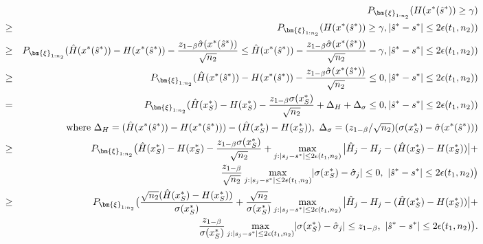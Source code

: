 \documentclass[mnsc,blindrev]{informs4} %
\begin{document}
\begin{eqnarray*}
&&P_{\bm{\xi}_{1:n_2}}(H(x^*(\hat s^*))\geq \gamma)\\
&\geq&P_{\bm{\xi}_{1:n_2}}(H(x^*(\hat s^*))\geq \gamma,\lvert \hat s^*-s^*\rvert\leq 2\epsilon(t_1,n_2))\\
&\geq&P_{\bm{\xi}_{1:n_2}}(\hat H(x^*(\hat s^*))-H(x^*(\hat s^*))-\frac{z_{1-\beta}\hat \sigma(x^*(\hat s^*))}{\sqrt{n_2}}\leq \hat H(x^*(\hat s^*))-\frac{z_{1-\beta}\hat \sigma(x^*(\hat s^*))}{\sqrt{n_2}}- \gamma,\lvert \hat s^*-s^*\rvert\leq 2\epsilon(t_1,n_2))\\
&\geq&P_{\bm{\xi}_{1:n_2}}(\hat H(x^*(\hat s^*))-H(x^*(\hat s^*))-\frac{z_{1-\beta}\hat \sigma(x^*(\hat s^*))}{\sqrt{n_2}}\leq 0,\lvert \hat s^*-s^*\rvert\leq 2\epsilon(t_1,n_2))\\
&=&P_{\bm{\xi}_{1:n_2}}(\hat H(x^*_S)-H(x^*_S)-\frac{z_{1-\beta}\sigma(x^*_S)}{\sqrt{n_2}}+\Delta_H+\Delta_{\sigma}\leq 0,\lvert \hat s^*-s^*\rvert\leq 2\epsilon(t_1,n_2))\\
&&\text{\ where }\Delta_H = (\hat H(x^*(\hat s^*))-H(x^*(\hat s^*)))-(\hat H(x^*_S)-H(x^*_S)),\ \Delta_{\sigma}=(z_{1-\beta}/\sqrt{n_2})(\sigma(x^*_S)-\hat \sigma(x^*(\hat s^*)))\\
&\geq&P_{\bm{\xi}_{1:n_2}}\big(\hat H(x^*_S)-H(x^*_S)-\frac{z_{1-\beta}\sigma(x^*_S)}{\sqrt{n_2}}+\max_{j:\lvert s_j-s^*\rvert\leq 2\epsilon(t_1,n_2)}\big\lvert\hat H_j-H_j-(\hat H(x^*_S)-H(x^*_S))\big\rvert+\\
&&\hspace{9ex}\frac{z_{1-\beta}}{\sqrt{n_2}}\max_{j:\lvert s_j-s^*\rvert\leq 2\epsilon(t_1,n_2)}\lvert \sigma(x^*_S)-\hat \sigma_j\rvert\leq 0,\ \lvert \hat s^*-s^*\rvert\leq 2\epsilon(t_1,n_2)\big)\\
&\geq&P_{\bm{\xi}_{1:n_2}}\big(\frac{\sqrt{n_2}(\hat H(x^*_S)-H(x^*_S))}{\sigma(x^*_S)}+\frac{\sqrt{n_2}}{\sigma(x^*_S)}\max_{j:\lvert s_j-s^*\rvert\leq 2\epsilon(t_1,n_2)}\big\lvert\hat H_j-H_j-(\hat H(x^*_S)-H(x^*_S))\big\rvert+\\
&&\hspace{9ex}\frac{z_{1-\beta}}{\sigma(x^*_S)}\max_{j:\lvert s_j-s^*\rvert\leq 2\epsilon(t_1,n_2)}\lvert \sigma(x^*_S)-\hat \sigma_j\rvert\leq z_{1-\beta},\ \lvert \hat s^*-s^*\rvert\leq 2\epsilon(t_1,n_2)\big).
\end{eqnarray*}
\end{document}
